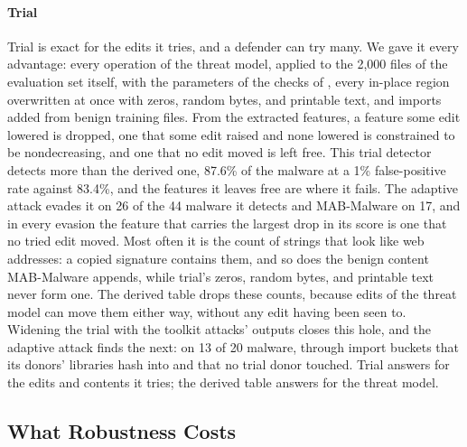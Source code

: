 \paragraph{Trial}
Trial is exact for the edits it tries, and a defender can try many. We gave it every advantage: every operation of the
threat model, applied to the 2,000 files of the evaluation set itself, with the parameters of the checks of
, every in-place region overwritten at once with zeros, random bytes, and printable text, and
imports added from benign training files. From the extracted features, a feature some edit lowered is dropped, one that
some edit raised and none lowered is constrained to be nondecreasing, and one that no edit moved is left free. This
trial detector detects more than the derived one, 87.6\% of the malware at a 1\% false-positive rate against 83.4\%,
and the features it leaves free are where it fails. The adaptive attack evades it
on 26 of the 44 malware it detects and MAB-Malware on 17, and in every evasion the feature that carries the largest
drop in its score is one that no tried edit moved. Most often it is the count of strings that look like web addresses:
a copied signature contains them, and so does the benign content MAB-Malware appends, while trial's zeros, random
bytes, and printable text never form one. The derived table drops these counts, because edits of the threat model can
move them either way, without any edit having been seen to. Widening the trial with the toolkit attacks' outputs
closes this hole, and the adaptive attack finds the next: on 13 of 20 malware, through import buckets that its donors'
libraries hash into and that no trial donor touched. Trial answers for the edits and contents it tries; the derived
table answers for the threat model.

\subsection{What Robustness Costs}
\label{sec:eval:detectors}

